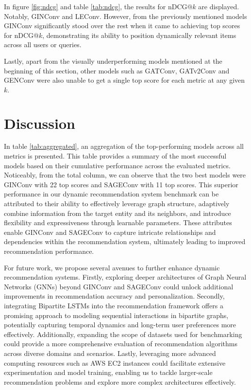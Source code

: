 \documentclass[bst/sn-nature]{sn-jnl}
\begin{document}
\begin{multicols}{2}
In figure \ref{fig:ndcg} and table \ref{tab:ndcg}, the results for nDCG@$k$ are displayed. Notably, GINConv and LEConv. However, from the previously mentioned models GINConv significantly stood over the rest when it came to achieving top scores for nDCG@$k$, demonstrating its ability to position dynamically relevant items across all users or queries.

Lastly, apart from the visually underperforming models mentioned at the beginning of this section, other models such as GATConv, GATv2Conv and GENConv were also unable to get a single top score for each metric at any given $k$.

\section{Discussion}

\quad In table \ref{tab:aggregated}, an aggregation of the top-performing models across all metrics is presented. This table provides a summary of the most successful models based on their cumulative performance across the evaluated metrics. Noticeably, from the total column, we can observe that the two best models were GINConv with 22 top scores and SAGEConv with 11 top scores. This superior performance in our dynamic recommendation system benchmark can be attributed to their ability to effectively leverage graph structure, adaptively combine information from the target entity and its neighbors, and introduce flexibility and expressiveness through learnable parameters. These attributes enable GINConv and SAGEConv to capture intricate relationships and dependencies within the recommendation system, ultimately leading to improved recommendation performance.

For future work, we propose several avenues to further enhance dynamic recommendation systems. Firstly, exploring deeper architectures of Graph Neural Networks (GNNs) beyond GINConv and SAGEConv could unlock additional improvements in recommendation accuracy and personalization. Secondly, integrating Bipartite LSTMs into the recommendation framework offers a promising approach to modeling sequential interactions in bipartite graphs, potentially capturing temporal dynamics and long-term user preferences more effectively. Additionally, expanding the scope of datasets used for benchmarking could provide a more comprehensive evaluation of recommendation algorithms across diverse domains and scenarios. Lastly, leveraging more advanced computing resources such as AWS EC2 instances could facilitate extensive experimentation and model training, enabling us to tackle larger-scale recommendation problems and explore more complex architectures effectively.


\end{multicols}
\end{document}
